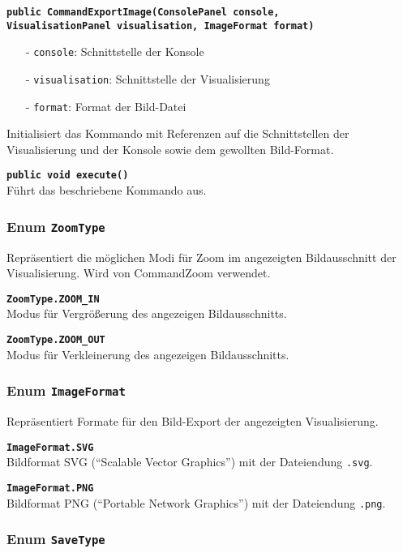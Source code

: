 \documentclass[parskip=full,11pt,twoside]{scrartcl}
\begin{document}
\textbf{\texttt{public CommandExportImage(ConsolePanel console,\\VisualisationPanel visualisation, ImageFormat format)}}
\begin{itemize}[noitemsep]
	\item[-] \texttt{console}: Schnittstelle der Konsole
	\item[-] \texttt{visualisation}: Schnittstelle der Visualisierung
	\item[-] \texttt{format}: Format der Bild-Datei
\end{itemize}
Initialisiert das Kommando mit Referenzen auf die Schnittstellen der Visualisierung und der Konsole sowie dem gewollten Bild-Format.

\textbf{\texttt{public void execute()}}\\
Führt das beschriebene Kommando aus.

\subsubsection{Enum \texttt{ZoomType}}

Repräsentiert die möglichen Modi für Zoom im angezeigten Bildausschnitt der Visualisierung. Wird von CommandZoom verwendet.

\textbf{\texttt{ZoomType.ZOOM\_IN}}\\
Modus für Vergrößerung des angezeigen Bildausschnitts.

\textbf{\texttt{ZoomType.ZOOM\_OUT}}\\
Modus für Verkleinerung des angezeigen Bildausschnitts.

\subsubsection{Enum \texttt{ImageFormat}}

Repräsentiert Formate für den Bild-Export der angezeigten Visualisierung.

\textbf{\texttt{ImageFormat.SVG}}\\
Bildformat SVG (\enquote{Scalable Vector Graphics}) mit der Dateiendung \texttt{.svg}.

\textbf{\texttt{ImageFormat.PNG}}\\
Bildformat PNG (\enquote{Portable Network Graphics}) mit der Dateiendung \texttt{.png}.

\subsubsection{Enum \texttt{SaveType}}
\end{document}
